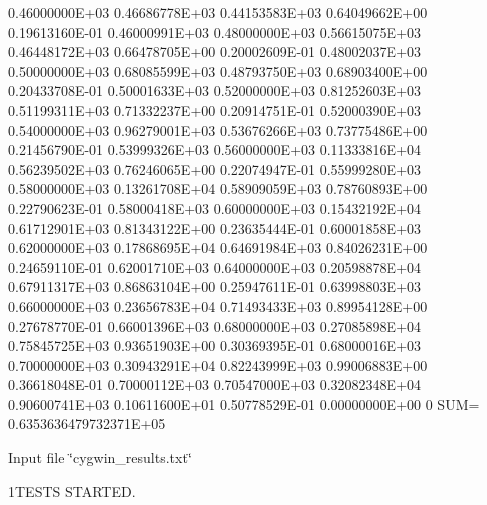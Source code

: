\begin{DoxyVerb}
    0.46000000E+03    0.46686778E+03    0.44153583E+03    0.64049662E+00    0.19613160E-01    0.46000991E+03
    0.48000000E+03    0.56615075E+03    0.46448172E+03    0.66478705E+00    0.20002609E-01    0.48002037E+03
    0.50000000E+03    0.68085599E+03    0.48793750E+03    0.68903400E+00    0.20433708E-01    0.50001633E+03
    0.52000000E+03    0.81252603E+03    0.51199311E+03    0.71332237E+00    0.20914751E-01    0.52000390E+03
    0.54000000E+03    0.96279001E+03    0.53676266E+03    0.73775486E+00    0.21456790E-01    0.53999326E+03
    0.56000000E+03    0.11333816E+04    0.56239502E+03    0.76246065E+00    0.22074947E-01    0.55999280E+03
    0.58000000E+03    0.13261708E+04    0.58909059E+03    0.78760893E+00    0.22790623E-01    0.58000418E+03
    0.60000000E+03    0.15432192E+04    0.61712901E+03    0.81343122E+00    0.23635444E-01    0.60001858E+03
    0.62000000E+03    0.17868695E+04    0.64691984E+03    0.84026231E+00    0.24659110E-01    0.62001710E+03
    0.64000000E+03    0.20598878E+04    0.67911317E+03    0.86863104E+00    0.25947611E-01    0.63998803E+03
    0.66000000E+03    0.23656783E+04    0.71493433E+03    0.89954128E+00    0.27678770E-01    0.66001396E+03
    0.68000000E+03    0.27085898E+04    0.75845725E+03    0.93651903E+00    0.30369395E-01    0.68000016E+03
    0.70000000E+03    0.30943291E+04    0.82243999E+03    0.99006883E+00    0.36618048E-01    0.70000112E+03
    0.70547000E+03    0.32082348E+04    0.90600741E+03    0.10611600E+01    0.50778529E-01    0.00000000E+00
0         SUM=  0.6353636479732371E+05
\end{DoxyVerb}


Input file \char`\"{}cygwin\+\_\+results.\+txt\char`\"{}

1\+T\+E\+S\+TS S\+T\+A\+R\+T\+ED.

